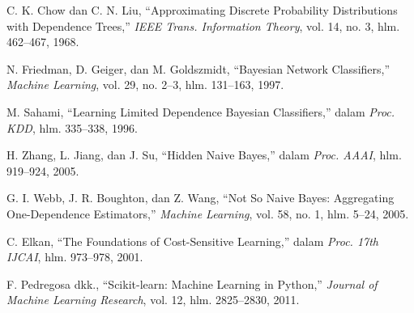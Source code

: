\documentclass[11pt,a4paper]{article}
\numberwithin{figure}{section}
\numberwithin{table}{section}
\begin{document}
\begin{enumerate}[label={[\arabic*]}, leftmargin=*, align=left, itemsep=4pt]
  \item C. K. Chow dan C. N. Liu, ``Approximating Discrete Probability Distributions with Dependence Trees,'' \textit{IEEE Trans. Information Theory}, vol. 14, no. 3, hlm. 462--467, 1968.
  \item N. Friedman, D. Geiger, dan M. Goldszmidt, ``Bayesian Network Classifiers,'' \textit{Machine Learning}, vol. 29, no. 2--3, hlm. 131--163, 1997.
  \item M. Sahami, ``Learning Limited Dependence Bayesian Classifiers,'' dalam \textit{Proc. KDD}, hlm. 335--338, 1996.
  \item H. Zhang, L. Jiang, dan J. Su, ``Hidden Naive Bayes,'' dalam \textit{Proc. AAAI}, hlm. 919--924, 2005.
  \item G. I. Webb, J. R. Boughton, dan Z. Wang, ``Not So Naive Bayes: Aggregating One-Dependence Estimators,'' \textit{Machine Learning}, vol. 58, no. 1, hlm. 5--24, 2005.
  \item C. Elkan, ``The Foundations of Cost-Sensitive Learning,'' dalam \textit{Proc. 17th IJCAI}, hlm. 973--978, 2001.
  \item F. Pedregosa dkk., ``Scikit-learn: Machine Learning in Python,'' \textit{Journal of Machine Learning Research}, vol. 12, hlm. 2825--2830, 2011.
\end{enumerate}
\end{document}
